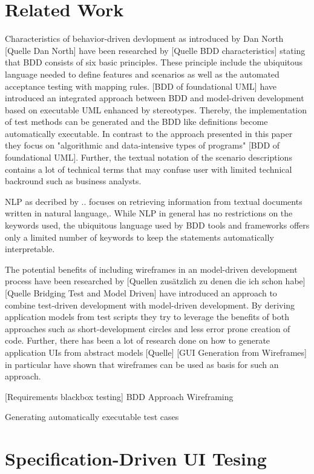 \documentclass{sig-alternate-05-2015}
\begin{document}
\section{Related Work}\label{sec:RelatedWork}
Characteristics of behavior-driven devlopment as introduced by Dan North [Quelle Dan North] have been researched by [Quelle BDD characteristics] stating that BDD consists of six basic principles.
These principle include the ubiquitous language needed to define features and scenarios as well as the automated acceptance testing with mapping rules.
[BDD of foundational UML] have introduced an integrated approach between BDD and model-driven development based on executable UML enhanced by stereotypes.
Thereby, the implementation of test methods can be generated and the BDD like definitions become automatically executable.
In contrast to the approach presented in this paper they focus on "algorithmic and data-intensive types of programs" [BDD of foundational UML].
Further, the textual notation of the scenario descriptions contains a lot of technical terms that may confuse user with limited technical backround such as business analysts.

NLP as decribed by .. focuses on retrieving information from textual documents written in natural language,.
While NLP in general has no restrictions on the keywords used, the ubiquitous language used by BDD tools and frameworks offers only a limited number of keywords to keep the statements automatically interpretable.


The potential benefits of including wireframes in an model-driven development process have been researched by [Quellen zusätzlich zu denen die ich schon habe]
[Quelle Bridging Test and Model Driven] have introduced an approach to combine test-driven development with model-driven development.
By deriving application models from test scripts they try to leverage the benefits of both approaches such as short-development circles and less error prone creation of code.
Further, there has been a lot of research done on how to generate application UIs from abstract models [Quelle]
[GUI Generation from Wireframes] in particular have shown that wireframes can be used as basis for such an approach.



[Requirements blackbox testing] 
BDD Approach
Wireframing

Generating automatically executable test cases


\section{Specification-Driven UI Tesing}\label{sec:SpecificationDrivenUITesting}
\end{document}
